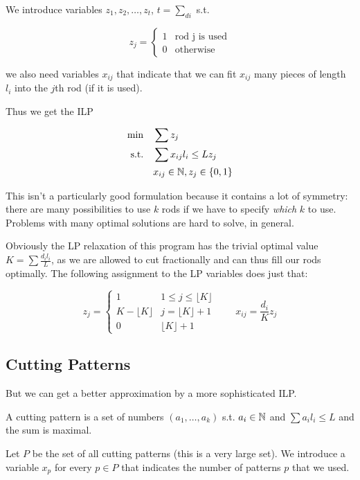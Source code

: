 We introduce variables $z_1,z_2,\ldots , z_t$, $t = \sum_{di}$ s.t. 

\[z_j=\begin{cases} 1 & \text{rod j is used}\\
0 & \text{otherwise}\end{cases}\]

we also need variables $x_{ij}$ that indicate that we can fit $x_{ij}$ many pieces of length $l_i$ into the $j$th rod (if it is used).

Thus we get the ILP

\begin{align*}
\min \quad & \sum z_j\\
\text{s.t.} \quad & \sum x_{ij}l_i \leq Lz_j\\
	&x_{ij} \in \mathbb{N}, z_j \in \{0,1\}
\end{align*}

This isn't a particularly good formulation because it contains a lot of symmetry: there are many possibilities to use $k$ rods if we have to specify \emph{which} $k$ to use. Problems with many optimal solutions are hard to solve, in general.

Obviously the LP relaxation of this program has the trivial optimal value $K=\sum \frac{d_il_i}{L}$, as we are allowed to cut fractionally and can thus fill our rods optimally. The following assignment to the LP variables does just that:

\[z_j = \begin{cases}
1 & 1 \leq j \leq \lfloor K\rfloor \\
K-\lfloor K \rfloor & j=\lfloor K\rfloor +1\\
0 & \lfloor K \rfloor +1\end{cases}\qquad x_{ij} = \frac{d_i}{K}z_j\]

\subsection{Cutting Patterns}

But we can get a better approximation by a more sophisticated ILP.

\begin{Def} A cutting pattern is a set of numbers $(a_1,\ldots,a_k)$ s.t. $a_i\in \mathbb{N}$ and $\sum a_il_i\leq L$ and the sum is maximal.
\end{Def}

Let $P$ be the set of all cutting patterns (this is a very large set). We introduce a variable $x_p$ for every $p\in P$ that indicates the number of patterns $p$ that we used.

